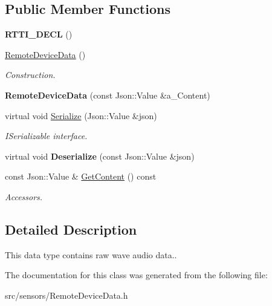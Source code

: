 \subsection*{Public Member Functions}
\begin{DoxyCompactItemize}
\item 
\mbox{\label{class_remote_device_data_aa35c80ce81c5627e886e3909db90e7ae}} 
{\bfseries R\+T\+T\+I\+\_\+\+D\+E\+CL} ()
\item 
\mbox{\label{class_remote_device_data_ac77524aa7b581843e1128f5ef329bedc}} 
\hyperlink{class_remote_device_data_ac77524aa7b581843e1128f5ef329bedc}{Remote\+Device\+Data} ()
\begin{DoxyCompactList}\small\item\em Construction. \end{DoxyCompactList}\item 
\mbox{\label{class_remote_device_data_ad23be6648de787fd8087c9aba9cbb23b}} 
{\bfseries Remote\+Device\+Data} (const Json\+::\+Value \&a\+\_\+\+Content)
\item 
\mbox{\label{class_remote_device_data_aff0d3e3b4177e16067681d6e771e8f7d}} 
virtual void \hyperlink{class_remote_device_data_aff0d3e3b4177e16067681d6e771e8f7d}{Serialize} (Json\+::\+Value \&json)
\begin{DoxyCompactList}\small\item\em I\+Serializable interface. \end{DoxyCompactList}\item 
\mbox{\label{class_remote_device_data_abfb67b5d82e2ebde84f31790858c2800}} 
virtual void {\bfseries Deserialize} (const Json\+::\+Value \&json)
\item 
\mbox{\label{class_remote_device_data_a807b1af07ab3c9666c7ad6b1bc6727ff}} 
const Json\+::\+Value \& \hyperlink{class_remote_device_data_a807b1af07ab3c9666c7ad6b1bc6727ff}{Get\+Content} () const
\begin{DoxyCompactList}\small\item\em Accessors. \end{DoxyCompactList}\end{DoxyCompactItemize}


\subsection{Detailed Description}
This data type contains raw wave audio data.. 

The documentation for this class was generated from the following file\+:\begin{DoxyCompactItemize}
\item 
src/sensors/Remote\+Device\+Data.\+h\end{DoxyCompactItemize}
